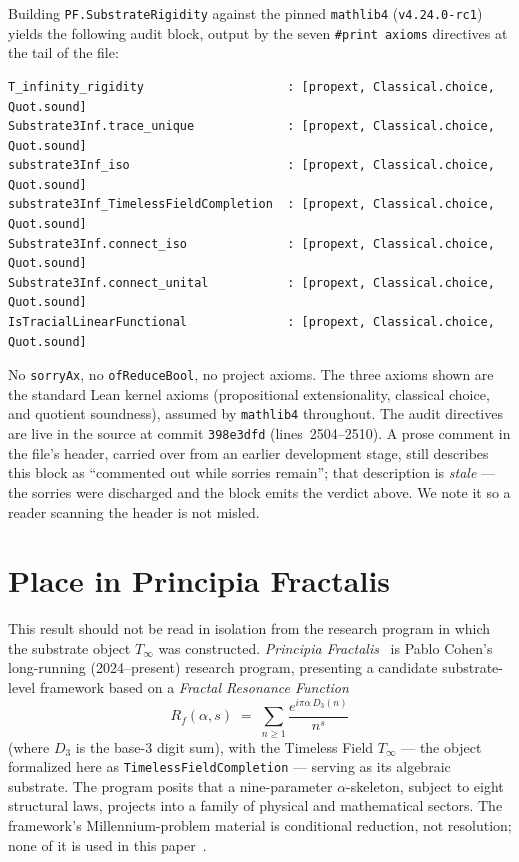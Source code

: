 \documentclass[11pt,a4paper]{article}
\theoremstyle{plain}
\theoremstyle{definition}
\begin{document}
Building \texttt{PF.SubstrateRigidity} against the pinned \texttt{mathlib4} (\texttt{v4.24.0-rc1}) yields the following audit block, output by the seven \texttt{\#print axioms} directives at the tail of the file:

\begin{lstlisting}[language={}]
T_infinity_rigidity                    : [propext, Classical.choice, Quot.sound]
Substrate3Inf.trace_unique             : [propext, Classical.choice, Quot.sound]
substrate3Inf_iso                      : [propext, Classical.choice, Quot.sound]
substrate3Inf_TimelessFieldCompletion  : [propext, Classical.choice, Quot.sound]
Substrate3Inf.connect_iso              : [propext, Classical.choice, Quot.sound]
Substrate3Inf.connect_unital           : [propext, Classical.choice, Quot.sound]
IsTracialLinearFunctional              : [propext, Classical.choice, Quot.sound]
\end{lstlisting}

\noindent
No \texttt{sorryAx}, no \texttt{ofReduceBool}, no project axioms. The three axioms shown are the standard Lean kernel axioms (propositional extensionality, classical choice, and quotient soundness), assumed by \texttt{mathlib4} throughout. The audit directives are live in the source at commit \texttt{398e3dfd} (lines~2504--2510). A prose comment in the file's header, carried over from an earlier development stage, still describes this block as ``commented out while sorries remain''; that description is \emph{stale} --- the sorries were discharged and the block emits the verdict above. We note it so a reader scanning the header is not misled.

\section{Place in Principia Fractalis}
\label{sec:pf-context}

This result should not be read in isolation from the research program in which the substrate object $T_{\infty}$ was constructed. \emph{Principia Fractalis}~\cite{cohen_pf_2026} is Pablo Cohen's long-running (2024--present) research program, presenting a candidate substrate-level framework based on a \emph{Fractal Resonance Function}
\[
R_f(\alpha, s) \;=\; \sum_{n \geq 1} \frac{e^{i \pi \alpha \, D_3(n)}}{n^s}
\]
(where $D_3$ is the base-3 digit sum), with the Timeless Field $T_{\infty}$ --- the object formalized here as \texttt{TimelessFieldCompletion} --- serving as its algebraic substrate. The program posits that a nine-parameter $\alpha$-skeleton, subject to eight structural laws, projects into a family of physical and mathematical sectors. The framework's Millennium-problem material is conditional reduction, not resolution; none of it is used in this paper~\cite{clay_problems}.
\end{document}
